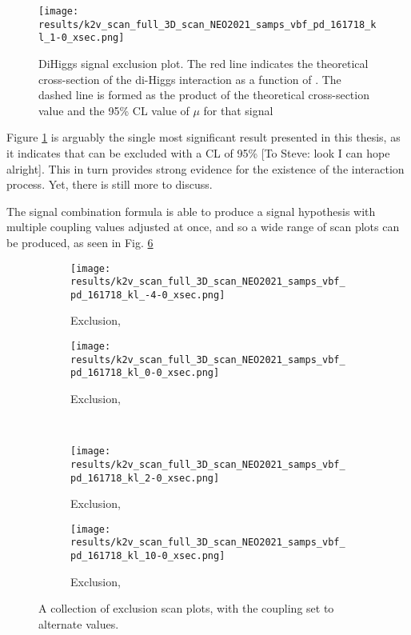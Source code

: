     \begin{figure}
        \texttt{[image: results/k2v\_scan\_full\_3D\_scan\_NEO2021\_samps\_vbf\_pd\_161718\_kl\_1-0\_xsec.png]}
        \caption{DiHiggs signal \kvv exclusion plot.
            The red line indicates the theoretical cross-section of the di-Higgs interaction as a function of \kvv.
            The dashed line is formed as the product of the theoretical cross-section value
                and the 95\% CL value of $\mu$ for that \kvv signal}
        \label{fig:kvv_SM_scan}
    \end{figure}

    Figure \ref{fig:kvv_SM_scan} is arguably the single most significant result presented in this thesis,
        as it indicates that  can be excluded with a CL of 95\% [To Steve: look I can hope alright].
    This in turn provides strong evidence for the existence of the \HHVV interaction process.
    Yet, there is still more to discuss.

    The signal combination formula is able to produce a signal hypothesis with multiple coupling values adjusted at once,
        and so a wide range of \kvv scan plots can be produced, as seen in Fig. \ref{fig:kvv_multi_kl}

    \begin{figure}
        \centering
        \begin{subfigure}{0.48\textwidth} 
            \texttt{[image: results/k2v\_scan\_full\_3D\_scan\_NEO2021\_samps\_vbf\_pd\_161718\_kl\_-4-0\_xsec.png]}
            \caption{\kvv Exclusion, }
            \label{fig:kvv_scan_kl0}
        \end{subfigure}
        \begin{subfigure}{0.48\textwidth} 
            \texttt{[image: results/k2v\_scan\_full\_3D\_scan\_NEO2021\_samps\_vbf\_pd\_161718\_kl\_0-0\_xsec.png]}
            \caption{\kvv Exclusion, }
            \label{fig:kvv_scan_kl1}
        \end{subfigure} \\
        \begin{subfigure}{0.48\textwidth}
            \texttt{[image: results/k2v\_scan\_full\_3D\_scan\_NEO2021\_samps\_vbf\_pd\_161718\_kl\_2-0\_xsec.png]}
            \caption{\kvv Exclusion, }
            \label{fig:kvv_scan_kl2}
        \end{subfigure}
        \begin{subfigure}{0.48\textwidth}
            \texttt{[image: results/k2v\_scan\_full\_3D\_scan\_NEO2021\_samps\_vbf\_pd\_161718\_kl\_10-0\_xsec.png]}
            \caption{\kvv Exclusion, }
            \label{fig:kvv_scan_kl10}
        \end{subfigure}
        \caption{
            A collection of \kvv exclusion scan plots, with the \kl coupling set to alternate values.
        }\label{fig:kvv_multi_kl}
    \end{figure}

